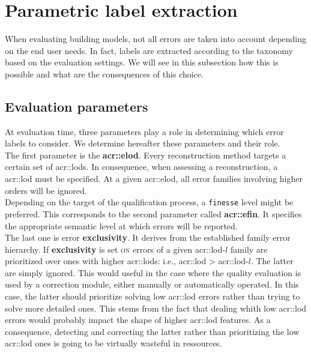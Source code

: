 \section{Parametric label extraction}
    \label{sec::semantic_evaluation::label_extraction}
    When evaluating building models, not all errors are taken into account depending on the end user needs.
    In fact, labels are extracted according to the taxonomy based on the evaluation settings.
    We will see in this subsection how this is possible and what are the consequences of this choice.

    \subsection{Evaluation parameters}
        At evaluation time, three parameters play a role in determining which error labels to consider.
        We determine hereafter these parameters and their role.\\

        The first parameter is the \textbf{\gls{acr::elod}}.
        Every reconstruction method targets a certain set of \glspl{acr::lod}.
        In consequence, when assessing a reconstruction, a \gls{acr::lod} must be specified.
        At a given \gls{acr::elod}, all error families involving higher orders will be ignored.\\
        Depending on the target of the qualification process, a \texttt{finesse} level might be preferred.
        This corresponds to the second parameter called \textbf{\gls{acr::efin}}.
        It specifies the appropriate semantic level at which errors will be reported.\\
        The last one is error \textbf{exclusivity}.
        It derives from the established family error hierarchy.
        If \textbf{exclusivity} is set \textsc{on} errors of a given \gls{acr::lod}-$l$ family are prioritized over ones with higher \glspl{acr::lod}: i.e., \gls{acr::lod} > \gls{acr::lod}-$l$.
        The latter are simply ignored.
        This would useful in the case where the quality evaluation is used by a correction module, either manually or automatically operated.
        In this case, the latter should prioritize solving low \gls{acr::lod} errors rather than trying to solve more detailed ones.
        This stems from the fact that dealing whith low \gls{acr::lod} errors would probably impact the shape of higher \gls{acr::lod} features.
        As a consequence, detecting and correcting the latter rather than prioritizing the low \gls{acr::lod} ones is going to be virtually wasteful in ressources.

